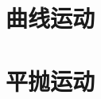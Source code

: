 \documentclass[a4paper, 12pt]{article}
\begin{document}
\section{曲线运动}
\section{平抛运动}
\end{document}
